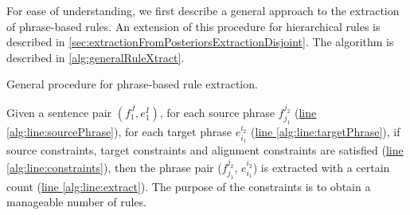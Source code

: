 For ease of understanding, we first describe a general approach to the
extraction of phrase-based rules. An extension of this procedure for
hierarchical rules is described in
\autoref{sec:extractionFromPosteriorsExtractionDisjoint}. The algorithm is
described in \autoref{alg:generalRuleXtract}.
%
\begin{algorithm}
  \caption{General procedure for phrase-based rule extraction.}
  \label{alg:generalRuleXtract}
  \begin{algorithmic}[1]
       \hypertarget{alg:line:sourcePhrase}{} \label{alg:line:sourcePhrase}
         \hypertarget{alg:line:targetPhrase}{} \label{alg:line:targetPhrase}
          \hypertarget{alg:line:constraints}{} \label{alg:line:constraints}
             \hypertarget{alg:line:extract}{} \label{alg:line:extract}
          \EndIf
        \EndFor
      \EndFor
    \EndFunction
  \end{algorithmic}
\end{algorithm}
%
Given a
sentence pair $(f_1^J, e_1^I)$, for each source phrase $f_{j_1}^{j_2}$
(\hyperlink{alg:line:sourcePhrase}{line \ref{alg:line:sourcePhrase}}), for each
target phrase $e_{i_1}^{i_2}$
(\hyperlink{alg:line:targetPhrase}{line \ref{alg:line:targetPhrase}}), if source
constraints, target constraints and
alignment constraints are satisfied
(\hyperlink{alg:line:constraints}{line \ref{alg:line:constraints}}), then the
phrase pair ($f_{j_1}^{j_2}$, $e_{i_1}^{i_2}$) is extracted with a certain
count (\hyperlink{alg:line:extract}{line \ref{alg:line:extract}}). The purpose
of the constraints is to obtain a manageable number of rules.

